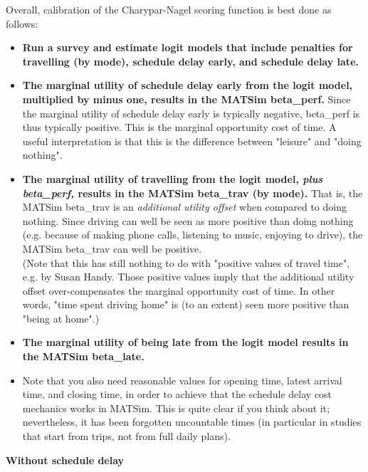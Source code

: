 \documentclass[a4paper,11pt]{report}
\begin{document}
Overall, calibration of the Charypar-Nagel scoring function is best done as follows:
\begin{itemize}
	\item \textbf{Run a survey and estimate logit models that include  penalties for travelling (by mode), schedule delay early, and schedule  delay late.}
	\item \textbf{The marginal utility of schedule delay early from the logit  model, multiplied by minus one, results in the MATSim beta\_perf.}  Since the marginal utility of schedule delay early is typically  negative, beta\_perf is thus typically positive. This is the  marginal opportunity cost of time. A useful interpretation is that  this is the difference between "leisure" and "doing nothing".
	\item \textbf{The marginal utility of travelling from the logit model, \emph{plus beta\_perf,} results in the MATSim beta\_trav (by mode).} That is, the MATSim beta\_trav is an \emph{additional utility offset}  when compared to doing nothing. Since driving can well be seen as  more positive than doing nothing (e.g. because of making phone calls,  listening to music, enjoying to drive), the MATSim beta\_trav can well be  positive.
\\   (Note that this has still nothing to do with "positive values of  travel time", e.g. by Susan Handy. Those positive values imply  that the additional utility offset over-compensates the marginal  opportunity cost of time. In other words, "time spent driving  home" is (to an extent) seen more positive than "being at home".)
	\item \textbf{The marginal utility of being late from the logit model results in the MATSim beta\_late.}
	\item Note that you also need reasonable values for opening time, latest  arrival time, and closing time, in order to achieve that the schedule  delay cost mechanics works in MATSim. This is quite clear if you  think about it; nevertheless, it has been forgotten uncountable times  (in particular in studies that start from trips, not from full daily  plans).
\end{itemize}

\textbf{Without schedule delay}
\end{document}
